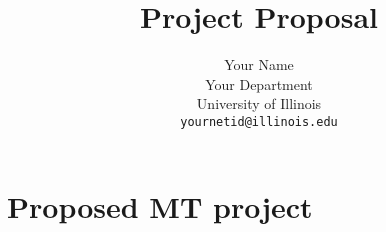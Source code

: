 \documentclass[11pt,a4paper]{article}
\title{Project Proposal}
\author{Your Name \\
  Your Department \\
  University of Illinois \\
  \texttt{yournetid@illinois.edu}}
\date{}
\begin{document}
\maketitle
\begin{abstract}
\lipsum[1] %
\end{abstract}

\section{Proposed MT project}

\lipsum[2-5] \lipsum[66] %


\nocite{Europarl} %



\end{document}
